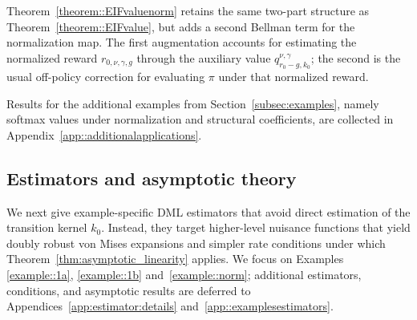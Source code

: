 \documentclass[12pt]{article}
\theoremstyle{plain}
\begin{document}
\noindent Theorem~\ref{theorem::EIFvaluenorm} retains the same two-part
structure as Theorem~\ref{theorem::EIFvalue}, but adds a second Bellman term
for the normalization map. The first augmentation accounts for estimating the
normalized reward \(r_{0,\nu,\gamma,g}\) through the auxiliary value
\(q_{r_0-g,k_0}^{\nu,\gamma}\); the second is the usual off-policy correction
for evaluating \(\pi\) under that normalized reward.

 

Results for the additional examples from Section~\ref{subsec:examples},
namely softmax values under normalization and structural coefficients, are
collected in Appendix~\ref{app::additionalapplications}.

 



\subsection{Estimators and asymptotic theory}
\label{sec::examplesestimators}

We next give example-specific DML estimators that avoid direct estimation of
the transition kernel \(k_0\). Instead, they target higher-level nuisance
functions that yield doubly robust von Mises expansions and simpler rate
conditions under which Theorem~\ref{thm:asymptotic_linearity} applies. We focus
on Examples~ \ref{example::1a}, \ref{example::1b} and~\ref{example::norm}; additional estimators,
conditions, and asymptotic results are deferred to
Appendices~\ref{app:estimator:details} and~\ref{app::examplesestimators}.
\end{document}
